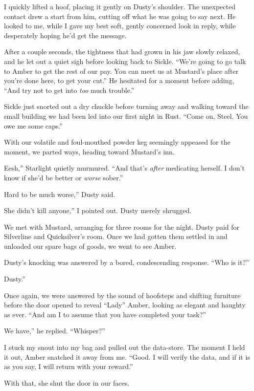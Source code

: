 I quickly lifted a hoof, placing it gently on Dusty’s shoulder. The unexpected contact drew a start from him, cutting off what he was going to say next. He looked to me, while I gave my best soft, gently concerned look in reply, while desperately hoping he’d get the message.

After a couple seconds, the tightness that had grown in his jaw slowly relaxed, and he let out a quiet sigh before looking back to Sickle. “We’re going to go talk to Amber to get the rest of our pay. You can meet us at Mustard’s place after you’re done here, to get your cut.” He hesitated for a moment before adding, “And try not to get into \textit{too} much trouble.”

Sickle just snorted out a dry chuckle before turning away and walking toward the small building we had been led into our first night in Rust. “Come on, Steel. You owe me some caps.”

With our volatile and foul-mouthed powder keg seemingly appeased for the moment, we parted ways, heading toward Mustard’s inn.

\leavevmode{}Eesh,” Starlight quietly murmured. “And that’s \textit{after} medicating herself. I don’t know if she’d be better or \textit{worse} sober.”

\leavevmode{}Hard to be much worse,” Dusty said.

\leavevmode{}She didn’t kill anyone,” I pointed out. Dusty merely shrugged.

We met with Mustard, arranging for three rooms for the night. Dusty paid for Silverline and Quicksilver’s room. Once we had gotten them settled in and unloaded our spare bags of goods, we went to see Amber.

Dusty’s knocking was answered by a bored, condescending response. “Who is it?”

\leavevmode{}Dusty.”

Once again, we were answered by the sound of hoofsteps and shifting furniture before the door opened to reveal “Lady” Amber, looking as elegant and haughty as ever. “And am I to assume that you have completed your task?”

\leavevmode{}We have,” he replied. “Whisper?”

I stuck my snout into my bag and pulled out the data-store. The moment I held it out, Amber snatched it away from me. “Good. I will verify the data, and if it is as you say, I will return with your reward.”

With that, she shut the door in our faces.

